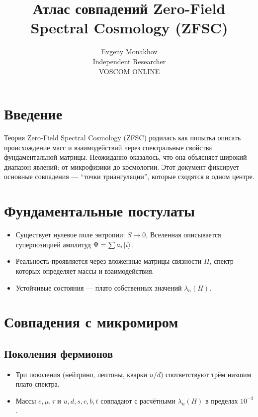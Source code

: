 \documentclass[a4paper,12pt]{article}
\begin{document}
\title{Атлас совпадений Zero-Field Spectral Cosmology (ZFSC)}
\author{Evgeny Monakhov \\ Independent Researcher \\ VOSCOM ONLINE}
\date{}
\maketitle

\section*{Введение}
Теория Zero-Field Spectral Cosmology (ZFSC) родилась как попытка описать происхождение масс и взаимодействий через спектральные свойства фундаментальной матрицы.  
Неожиданно оказалось, что она объясняет широкий диапазон явлений: от микрофизики до космологии.  
Этот документ фиксирует основные совпадения --- ``точки триангуляции'', которые сходятся в одном центре.

\section*{Фундаментальные постулаты}
\begin{itemize}
  \item Существует нулевое поле энтропии: $S \to 0$, Вселенная описывается суперпозицией амплитуд $\Psi = \sum a_i \ket{i}$.
  \item Реальность проявляется через вложенные матрицы связности $H$, спектр которых определяет массы и взаимодействия.
  \item Устойчивые состояния --- плато собственных значений $\lambda_n(H)$.
\end{itemize}

\section*{Совпадения с микромиром}

\subsection*{Поколения фермионов}
\begin{itemize}
  \item Три поколения (нейтрино, лептоны, кварки $u/d$) соответствуют трём низшим плато спектра.
  \item Массы $e,\mu,\tau$ и $u,d,s,c,b,t$ совпадают с расчётными $\lambda_n(H)$ в пределах $10^{-2}$.
\end{itemize}
\end{document}
